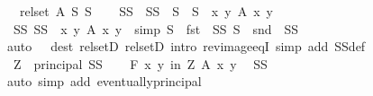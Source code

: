 \begin{isabellebody}
\ {\isacharasterisk}{\kern0pt}{\isacharcolon}{\kern0pt}\ {\isachardoublequoteopen}rel{\isacharunderscore}{\kern0pt}set\ A\ S\ S{\isacharprime}{\kern0pt}{\isachardoublequoteclose}\isanewline
\ \ \isamarkupfalse%
\ SS{\isacharprime}{\kern0pt}\ \ {\isachardoublequoteopen}SS{\isacharprime}{\kern0pt}\ {\isacharequal}{\kern0pt}\ S\ {\isasymtimes}\ S{\isacharprime}{\kern0pt}\ {\isasyminter}\ {\isacharbraceleft}{\kern0pt}{\isacharparenleft}{\kern0pt}x{\isacharcomma}{\kern0pt}\ y{\isacharparenright}{\kern0pt}{\isachardot}{\kern0pt}\ A\ x\ y{\isacharbraceright}{\kern0pt}{\isachardoublequoteclose}\isanewline
\ \ \isamarkupfalse%
\ SS{\isacharprime}{\kern0pt}{\isacharcolon}{\kern0pt}\ {\isachardoublequoteopen}SS{\isacharprime}{\kern0pt}\ {\isasymsubseteq}\ {\isacharbraceleft}{\kern0pt}{\isacharparenleft}{\kern0pt}x{\isacharcomma}{\kern0pt}\ y{\isacharparenright}{\kern0pt}{\isachardot}{\kern0pt}\ A\ x\ y{\isacharbraceright}{\kern0pt}{\isachardoublequoteclose}\ \ {\isacharbrackleft}{\kern0pt}simp{\isacharbrackright}{\kern0pt}{\isacharcolon}{\kern0pt}\ {\isachardoublequoteopen}S\ {\isacharequal}{\kern0pt}\ fst\ {\isacharbackquote}{\kern0pt}\ SS{\isacharprime}{\kern0pt}{\isachardoublequoteclose}\ {\isachardoublequoteopen}S{\isacharprime}{\kern0pt}\ {\isacharequal}{\kern0pt}\ snd\ {\isacharbackquote}{\kern0pt}\ SS{\isacharprime}{\kern0pt}{\isachardoublequoteclose}\isanewline
\ \ \ \ \isamarkupfalse%
\ {\isacharasterisk}{\kern0pt}\ \isamarkupfalse%
{\isacharparenleft}{\kern0pt}auto\ {}\ {}\ dest{\isacharcolon}{\kern0pt}\ rel{\isacharunderscore}{\kern0pt}setD{}\ rel{\isacharunderscore}{\kern0pt}setD{}\ intro{\isacharcolon}{\kern0pt}\ rev{\isacharunderscore}{\kern0pt}image{\isacharunderscore}{\kern0pt}eqI\ simp\ add{\isacharcolon}{\kern0pt}\ SS{\isacharprime}{\kern0pt}{\isacharunderscore}{\kern0pt}def{\isacharparenright}{\kern0pt}\isanewline
\ \ \isamarkupfalse%
\ {\isacharquery}{\kern0pt}Z\ {\isacharequal}{\kern0pt}\ {\isachardoublequoteopen}principal\ SS{\isacharprime}{\kern0pt}{\isachardoublequoteclose}\isanewline
\ \ \isamarkupfalse%
\ {\isachardoublequoteopen}{\isasymforall}\isactrlsub F\ {\isacharparenleft}{\kern0pt}x{\isacharcomma}{\kern0pt}\ y{\isacharparenright}{\kern0pt}\ in\ {\isacharquery}{\kern0pt}Z{\isachardot}{\kern0pt}\ A\ x\ y{\isachardoublequoteclose}\ \isamarkupfalse%
\ SS{\isacharprime}{\kern0pt}\ \isamarkupfalse%
{\isacharparenleft}{\kern0pt}auto\ simp\ add{\isacharcolon}{\kern0pt}\ eventually{\isacharunderscore}{\kern0pt}principal{\isacharparenright}{\kern0pt}\isanewline

\end{isabellebody}
